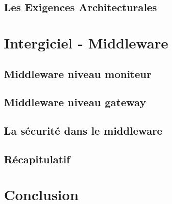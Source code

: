 \documentclass{article}
\begin{document}
\subsection{Les Exigences Architecturales}


\section{Intergiciel - Middleware}
\subsection{Middleware niveau moniteur}

\subsection{Middleware niveau gateway}

\subsection{La sécurité dans le middleware}

\subsection{Récapitulatif}


%

\section{ Conclusion }

 







\end{document}
